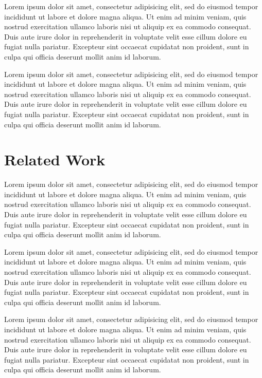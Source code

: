 \documentclass[11pt,letterpaper]{article}
\begin{document}
Lorem ipsum dolor sit amet, consectetur adipisicing elit, sed do eiusmod tempor incididunt ut labore et dolore magna aliqua. Ut enim ad minim veniam, quis nostrud exercitation ullamco laboris nisi ut aliquip ex ea commodo consequat. Duis aute irure dolor in reprehenderit in voluptate velit esse cillum dolore eu fugiat nulla pariatur. Excepteur sint occaecat cupidatat non proident, sunt in culpa qui officia deserunt mollit anim id laborum.

Lorem ipsum dolor sit amet, consectetur adipisicing elit, sed do eiusmod tempor incididunt ut labore et dolore magna aliqua. Ut enim ad minim veniam, quis nostrud exercitation ullamco laboris nisi ut aliquip ex ea commodo consequat. Duis aute irure dolor in reprehenderit in voluptate velit esse cillum dolore eu fugiat nulla pariatur. Excepteur sint occaecat cupidatat non proident, sunt in culpa qui officia deserunt mollit anim id laborum.


\section{Related Work}

Lorem ipsum dolor sit amet, consectetur adipisicing elit, sed do eiusmod tempor incididunt ut labore et dolore magna aliqua. Ut enim ad minim veniam, quis nostrud exercitation ullamco laboris nisi ut aliquip ex ea commodo consequat. Duis aute irure dolor in reprehenderit in voluptate velit esse cillum dolore eu fugiat nulla pariatur. Excepteur sint occaecat cupidatat non proident, sunt in culpa qui officia deserunt mollit anim id laborum.

Lorem ipsum dolor sit amet, consectetur adipisicing elit, sed do eiusmod tempor incididunt ut labore et dolore magna aliqua. Ut enim ad minim veniam, quis nostrud exercitation ullamco laboris nisi ut aliquip ex ea commodo consequat. Duis aute irure dolor in reprehenderit in voluptate velit esse cillum dolore eu fugiat nulla pariatur. Excepteur sint occaecat cupidatat non proident, sunt in culpa qui officia deserunt mollit anim id laborum.

Lorem ipsum dolor sit amet, consectetur adipisicing elit, sed do eiusmod tempor incididunt ut labore et dolore magna aliqua. Ut enim ad minim veniam, quis nostrud exercitation ullamco laboris nisi ut aliquip ex ea commodo consequat. Duis aute irure dolor in reprehenderit in voluptate velit esse cillum dolore eu fugiat nulla pariatur. Excepteur sint occaecat cupidatat non proident, sunt in culpa qui officia deserunt mollit anim id laborum.
\end{document}
